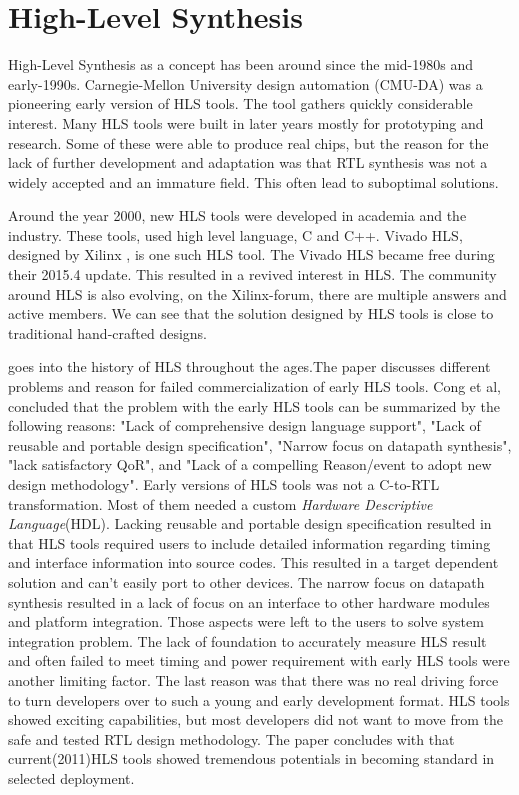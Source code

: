 \section{High-Level Synthesis}
High-Level Synthesis as a concept has been around since the mid-1980s and early-1990s\cite{HLSTutorial}\citep{HLSPastFutur}. Carnegie-Mellon University design automation (CMU-DA)\citep{1085036}\citep{Parker:1979:CDA:800292.811694} was a pioneering early version of HLS tools. The tool gathers quickly considerable interest. Many HLS tools were built in later years mostly for prototyping and research\cite{Granacki:1985:AAD:317825.317970}\citep{Paulin:1986:HMA:318013.318055}\citep{4069894}. Some of these were able to produce real chips, but the reason for the lack of further development and adaptation was that RTL synthesis was not a widely accepted and an immature field. This often lead to suboptimal solutions. 

Around the year 2000, new HLS tools were developed in academia and the industry. These tools, used high level language, C and C++. Vivado HLS, designed by Xilinx \citep{6409453}, is one such HLS tool. The Vivado HLS became free during their 2015.4 update\citep{VIVADOHLS}. This resulted in a revived interest in HLS. The community around HLS is also evolving, on the Xilinx-forum, there are multiple answers and active members. We can see that the solution designed by HLS tools is close to traditional hand-crafted designs\citep{6718388}.

\cite{HLSTutorial} goes into the history of HLS throughout the ages.The paper discusses different problems and reason for failed commercialization of early HLS tools. Cong et al, concluded that the problem with the early HLS tools can be summarized by the following reasons: "Lack of comprehensive design language support", "Lack of reusable and portable design specification", "Narrow focus on datapath synthesis", "lack satisfactory QoR", and "Lack of a compelling Reason/event to adopt new design methodology".
 Early versions of HLS tools was not a C-to-RTL transformation. Most of them needed a custom \textit{Hardware Descriptive Language}(HDL). Lacking reusable and portable design specification resulted in that HLS tools required users to include detailed information regarding timing and interface information into source codes. This resulted in a target dependent solution and can't easily port to other devices. The narrow focus on datapath synthesis resulted in a lack of focus on an interface to other hardware modules and platform integration. Those aspects were left to the users to solve system integration problem. The lack of foundation to accurately measure HLS result and often failed to meet timing and power requirement with early HLS tools were another limiting factor. The last reason was that there was no real driving force to turn developers over to such a young and early development format. HLS tools showed exciting capabilities, but most developers did not want to move from the safe and tested RTL design methodology. The paper concludes with that current(2011)HLS tools showed tremendous potentials in becoming standard in selected deployment.

